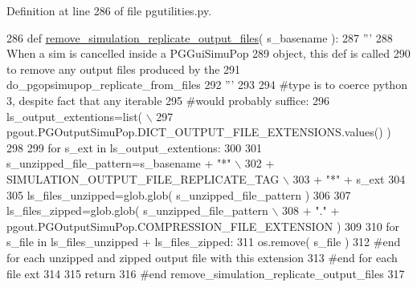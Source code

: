 Definition at line 286 of file pgutilities.\+py.


\begin{DoxyCode}
286 \textcolor{keyword}{def }\hyperlink{namespacenegui_1_1pgutilities_aa37c7d125e4eaec2eeea639f53fa140d}{remove\_simulation\_replicate\_output\_files}( s\_basename ):
287     \textcolor{stringliteral}{'''}
288 \textcolor{stringliteral}{    When a sim is cancelled inside a PGGuiSimuPop}
289 \textcolor{stringliteral}{    object, this def is called}
290 \textcolor{stringliteral}{    to remove any output files produced by the}
291 \textcolor{stringliteral}{    do\_pgopsimupop\_replicate\_from\_files}
292 \textcolor{stringliteral}{    '''}
293 
294     \textcolor{comment}{#type is to coerce python 3, despite fact that any iterable}
295     \textcolor{comment}{#would probably suffice:}
296     ls\_output\_extentions=list( \(\backslash\)
297             pgout.PGOutputSimuPop.DICT\_OUTPUT\_FILE\_EXTENSIONS.values() )
298 
299     \textcolor{keywordflow}{for} s\_ext \textcolor{keywordflow}{in} ls\_output\_extentions:
300 
301         s\_unzipped\_file\_pattern=s\_basename + \textcolor{stringliteral}{"*"} \(\backslash\)
302                 + SIMULATION\_OUTPUT\_FILE\_REPLICATE\_TAG \(\backslash\)
303                 + \textcolor{stringliteral}{"*"} + s\_ext
304 
305         ls\_files\_unzipped=glob.glob( s\_unzipped\_file\_pattern )
306 
307         ls\_files\_zipped=glob.glob( s\_unzipped\_file\_pattern \(\backslash\)
308                 + \textcolor{stringliteral}{"."} + pgout.PGOutputSimuPop.COMPRESSION\_FILE\_EXTENSION )
309 
310         \textcolor{keywordflow}{for} s\_file \textcolor{keywordflow}{in} ls\_files\_unzipped + ls\_files\_zipped:
311             os.remove( s\_file )
312         \textcolor{comment}{#end for each unzipped and zipped output file with this extension}
313     \textcolor{comment}{#end for each file ext}
314 
315     \textcolor{keywordflow}{return}
316 \textcolor{comment}{#end remove\_simulation\_replicate\_output\_files}
317 
\end{DoxyCode}
